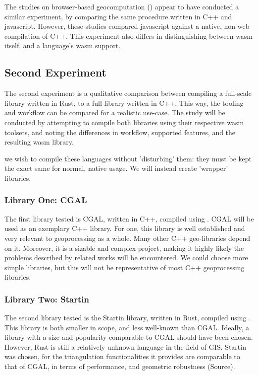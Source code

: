 The studies on browser-based geocomputation () appear to have conducted a similar experiment, by comparing the same procedure written in C++ and javascript. 
However, these studies compared javascript against a native, non-web compilation of C++. 
This experiment also differs in distinguishing between \ac{wasm} itself, and a language's \ac{wasm} support.


\subsection{Second Experiment}
The second experiment is a qualitative comparison between compiling a full-scale library written in Rust, to a full library written in C++. 
This way, the tooling and workflow can be compared for a realistic use-case. 
The study will be conducted by attempting to compile both libraries using their respective \ac{wasm} toolsets, and noting the differences in workflow, supported features, and the resulting wasm library. 

we wish to compile these languages without 'disturbing' them: they must be kept the exact same for normal, native usage. 
We will instead create 'wrapper' libraries. 

\subsubsection*{Library One: CGAL}
The first library tested is CGAL, written in C++, compiled using .
CGAL will be used as an exemplary C++ library. 
For one, this library is well established and very relevant to geoprocessing as a whole. 
Many other C++ geo-libraries depend on it.
Moreover, it is a sizable and complex project, making it highly likely the problems described by related works will be encountered. 
We could choose more simple libraries, but this will not be representative of most C++ geoprocessing libraries. 

\subsubsection*{Library Two: Startin}
The second library tested is the Startin library, written in Rust, compiled using .  
This library is both smaller in scope, and less well-known than CGAL. 
Ideally, a library with a size and popularity comparable to CGAL should have been chosen.
However, Rust is still a relatively unknown language in the field of GIS. 
Startin was chosen, for the triangulation functionalities it provides are comparable to that of CGAL, in terms of performance, and geometric robustness (Source). 


